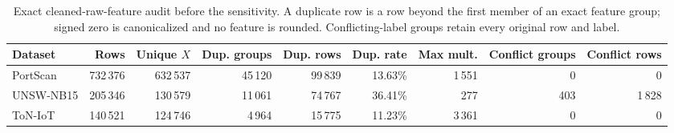 \begin{table}[t]
\centering
\caption{Exact cleaned-raw-feature audit before the sensitivity. A duplicate row is a row
beyond the first member of an exact feature group; signed zero is canonicalized and no
feature is rounded. Conflicting-label groups retain every original row and label.}
\label{tab:value_disjoint_overlap}
\scriptsize
\setlength{\tabcolsep}{3pt}
\begin{tabular}{l r r r r r r r r}
\toprule
Dataset & Rows & Unique $X$ & Dup. groups & Dup. rows & Dup. rate & Max mult. & Conflict groups & Conflict rows \\
\midrule
PortScan & 732\,376 & 632\,537 & 45\,120 & 99\,839 & 13.63\% & 1\,551 & 0 & 0 \\
UNSW-NB15 & 205\,346 & 130\,579 & 11\,061 & 74\,767 & 36.41\% & 277 & 403 & 1\,828 \\
ToN-IoT & 140\,521 & 124\,746 & 4\,964 & 15\,775 & 11.23\% & 3\,361 & 0 & 0 \\
\bottomrule
\end{tabular}
\end{table}
